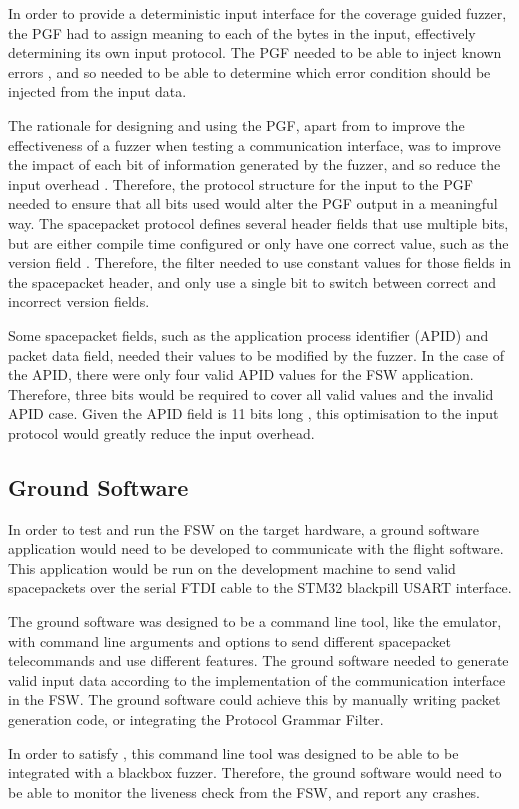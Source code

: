 \documentclass[../report.tex]{subfiles}
\begin{document}
In order to provide a deterministic input interface for the coverage guided
fuzzer, the PGF had to assign meaning to each of the bytes in the input,
effectively determining its own input protocol. The PGF needed to be able to
inject known errors , and so needed to be able to determine which
error condition should be injected from the input data.

The rationale for designing and using the PGF, apart from to improve the
effectiveness of a fuzzer when testing a communication interface, was to
improve the impact of each bit of information generated by the fuzzer, and so
reduce the input overhead \citep{Fuzzware_2022, Hoedur_2023,
Fuzztruction_2023}. Therefore, the protocol structure for the input to the PGF
needed to ensure that all bits used would alter the PGF output in a meaningful
way. The spacepacket protocol defines several header fields that use multiple
bits, but are either compile time configured or only have one correct value,
such as the version field \citep{Ccsds_spp}. Therefore, the filter needed to
use constant values for those fields in the spacepacket header, and only use a
single bit to switch between correct and incorrect version fields.

Some spacepacket fields, such as the application process identifier (APID) and
packet data field, needed their values to be modified by the fuzzer. In the
case of the APID, there were only four valid APID values for the FSW
application. Therefore, three bits would be required to cover all valid values
and the invalid APID case. Given the APID field is 11 bits long
\citep{Ccsds_spp}, this optimisation to the input protocol would greatly reduce
the input overhead.

\subsection{Ground Software}

In order to test and run the FSW on the target hardware, a ground software
application would need to be developed to communicate with the flight software.
This application would be run on the development machine to send valid
spacepackets over the serial FTDI cable to the STM32 blackpill USART interface.

The ground software was designed to be a command line tool, like the emulator,
with command line arguments and options to send different spacepacket
telecommands and use different features. The ground software needed to generate
valid input data according to the implementation of the communication interface
in the FSW. The ground software could achieve this by manually writing packet
generation code, or integrating the Protocol Grammar Filter.

In order to satisfy , this command line tool was designed to be
able to be integrated with a blackbox fuzzer. Therefore, the ground software
would need to be able to monitor the liveness check from the FSW, and report
any crashes.
\end{document}
